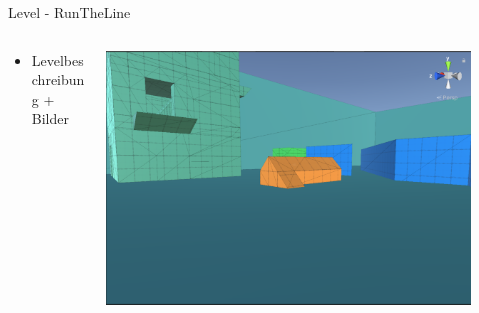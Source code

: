 \documentclass[xcolor=dvipsnames]{beamer}
\begin{document}
\begin{frame}{Level - RunTheLine}
\begin{columns}
\begin{column}{0.5\textwidth}
	\begin{itemize}
		\item Levelbeschreibung + Bilder 
	\end{itemize}
\end{column}
\begin{column}{0.5\textwidth} 
	\begin{center}
		\includegraphics[width=0.9\textwidth]{Level_view.png}
	\end{center}
\end{column}
\end{columns}

\end{frame}
\end{document}
